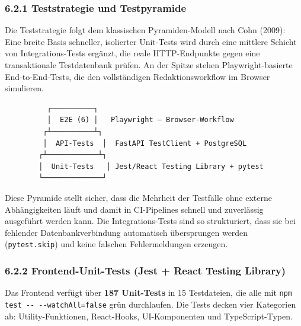 \subsubsection{6.2.1 Teststrategie und
Testpyramide}\label{teststrategie-und-testpyramide}

Die Teststrategie folgt dem klassischen Pyramiden-Modell nach Cohn
(2009): Eine breite Basis schneller, isolierter Unit-Tests wird durch
eine mittlere Schicht von Integrations-Tests ergänzt, die reale
HTTP-Endpunkte gegen eine transaktionale Testdatenbank prüfen. An der
Spitze stehen Playwright-basierte End-to-End-Tests, die den
vollständigen Redaktionsworkflow im Browser simulieren.

\begin{lstlisting}
          ┌──────────┐
          │  E2E (6) │   Playwright — Browser-Workflow
         ┌┴──────────┴┐
         │  API-Tests  │  FastAPI TestClient + PostgreSQL
        ┌┴────────────┴┐
        │  Unit-Tests   │ Jest/React Testing Library + pytest
        └──────────────┘
\end{lstlisting}

Diese Pyramide stellt sicher, dass die Mehrheit der Testfälle ohne
externe Abhängigkeiten läuft und damit in CI-Pipelines schnell und
zuverlässig ausgeführt werden kann. Die Integrations-Tests sind so
strukturiert, dass sie bei fehlender Datenbankverbindung automatisch
übersprungen werden (\passthrough{\lstinline!pytest.skip!}) und keine
falschen Fehlermeldungen erzeugen.

\subsubsection{6.2.2 Frontend-Unit-Tests (Jest + React Testing
Library)}\label{frontend-unit-tests-jest-react-testing-library}

Das Frontend verfügt über \textbf{187 Unit-Tests} in 15 Testdateien, die
alle mit \passthrough{\lstinline!npm test -- --watchAll=false!} grün
durchlaufen. Die Tests decken vier Kategorien ab: Utility-Funktionen,
React-Hooks, UI-Komponenten und TypeScript-Typen.

